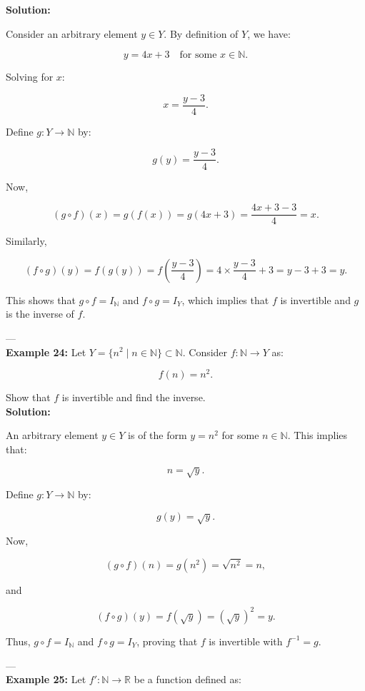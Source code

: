 \documentclass[12pt]{article}
\begin{document}
\textbf{Solution:}  

Consider an arbitrary element \( y \in Y \). By definition of \( Y \), we have:

\[
y = 4x + 3 \quad \text{for some } x \in \mathbb{N}.
\]

Solving for \( x \):

\[
x = \frac{y - 3}{4}.
\]

Define \( g: Y \to \mathbb{N} \) by:

\[
g(y) = \frac{y - 3}{4}.
\]

Now,

\[
(g \circ f)(x) = g(f(x)) = g(4x + 3) = \frac{4x + 3 - 3}{4} = x.
\]

Similarly,

\[
(f \circ g)(y) = f(g(y)) = f\left(\frac{y - 3}{4}\right) = 4 \times \frac{y - 3}{4} + 3 = y - 3 + 3 = y.
\]

This shows that \( g \circ f = I_{\mathbb{N}} \) and \( f \circ g = I_Y \), which implies that \( f \) is invertible and \( g \) is the inverse of \( f \).

---
\\

\textbf{Example 24:}  
Let \( Y = \{ n^2 \mid n \in \mathbb{N} \} \subset \mathbb{N} \). Consider \( f: \mathbb{N} \to Y \) as:

\[
f(n) = n^2.
\]

Show that \( f \) is invertible and find the inverse.
\\

\textbf{Solution:}  

An arbitrary element \( y \in Y \) is of the form \( y = n^2 \) for some \( n \in \mathbb{N} \). This implies that:

\[
n = \sqrt{y}.
\]

Define \( g: Y \to \mathbb{N} \) by:

\[
g(y) = \sqrt{y}.
\]

Now,

\[
(g \circ f)(n) = g(n^2) = \sqrt{n^2} = n,
\]

and

\[
(f \circ g)(y) = f(\sqrt{y}) = (\sqrt{y})^2 = y.
\]

Thus, \( g \circ f = I_{\mathbb{N}} \) and \( f \circ g = I_Y \), proving that \( f \) is invertible with \( f^{-1} = g \).

---
\\
\textbf{Example 25:}  
Let \( f': \mathbb{N} \to \mathbb{R} \) be a function defined as:
\end{document}

